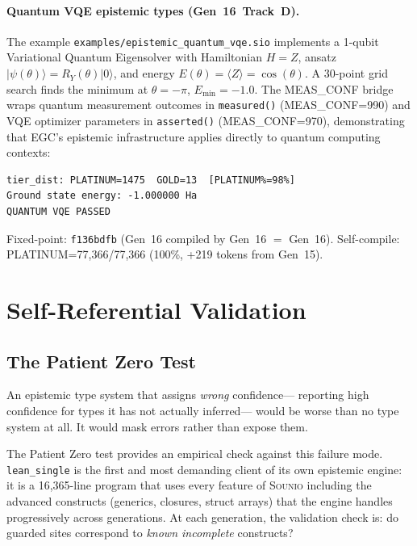 \documentclass[acmsmall,screen,review,anonymous]{acmart}
\newcommand{\sounio}{\textsc{Sounio}\xspace}
\newcommand{\lean}{\texttt{lean\_single}\xspace}
\begin{document}
\paragraph{Quantum VQE epistemic types (Gen~16~Track~D).}
The example \texttt{examples/epistemic\_quantum\_vqe.sio} implements a
1-qubit Variational Quantum Eigensolver with Hamiltonian $H=Z$, ansatz
$|\psi(\theta)\rangle = R_Y(\theta)|0\rangle$, and energy
$E(\theta) = \langle Z\rangle = \cos(\theta)$.
A 30-point grid search finds the minimum at $\theta = -\pi$,
$E_\text{min} = -1.0$.
The MEAS\_CONF bridge wraps quantum measurement outcomes in
\texttt{measured()} (MEAS\_CONF=990) and VQE optimizer parameters in
\texttt{asserted()} (MEAS\_CONF=970), demonstrating that EGC's epistemic
infrastructure applies directly to quantum computing contexts:
\begin{verbatim}
tier_dist: PLATINUM=1475  GOLD=13  [PLATINUM%=98%]
Ground state energy: -1.000000 Ha
QUANTUM VQE PASSED
\end{verbatim}

Fixed-point: \texttt{f136bdfb} (Gen~16 compiled by Gen~16 $=$ Gen~16).
Self-compile: PLATINUM=77,366/77,366 (100\%, +219 tokens from Gen~15).

\section{Self-Referential Validation}
\label{sec:selfref}

\subsection{The Patient Zero Test}

An epistemic type system that assigns \emph{wrong} confidence---
reporting high confidence for types it has not actually inferred---
would be worse than no type system at all.
It would mask errors rather than expose them.

The Patient Zero test provides an empirical check against this failure mode.
\lean is the first and most demanding client of its own epistemic engine:
it is a 16,365-line program that uses every feature of \sounio including
the advanced constructs (generics, closures, struct arrays) that the engine
handles progressively across generations.
At each generation, the validation check is: do guarded sites correspond
to \emph{known incomplete} constructs?
\end{document}
